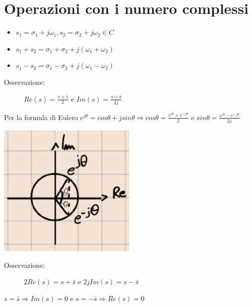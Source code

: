 \documentclass[a4paper, 12pt]{book}
\theoremstyle{plain}
\begin{document}
\section{Operazioni con i numero complessi}

\begin{itemize}
    \item $s_1=\sigma_1+j\omega_1,s_2=\sigma_2+j\omega_2\in C$
    \item $s_1+s_2=\sigma_1+\sigma_2+j(\omega_1+\omega_2)$
    \item $s_1-s_2=\sigma_1-\sigma_2+j(\omega_1-\omega_2)$
\end{itemize}
\begin{description}
    \item[Osservazione:] $Re(s)=\frac{s+\bar{s}}{2}$ e $Im(s)=\frac{s+\bar{s}}{2j}$ 
\end{description}
Per la formula di Eulero $e^{j\theta}=cos\theta+jsin\theta \Rightarrow cos\theta = \frac{e^{j\theta}+e^{-j\theta}}{2}$ e
$sin\theta =\frac{e^{j\theta} -e^{-j\theta}}{2j}$
\begin{center}
    \includegraphics[width=0.5\textwidth]{num_comp6.png}
\end{center}
\begin{description}
    \item[Osservazione:]$2Re(s)=s+\bar{s}$ e $2jIm(s)=s-\bar{s}$ 
\end{description}
$s=\bar{s} \Rightarrow Im(s)=0$ e $s=-\bar{s} \Rightarrow Re(s)=0$
\end{document}
